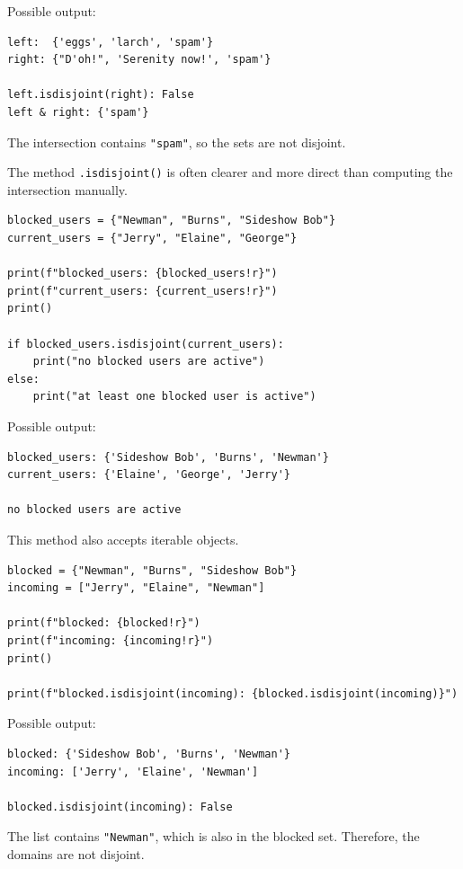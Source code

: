 Possible output:

\begin{verbatim}
left:  {'eggs', 'larch', 'spam'}
right: {"D'oh!", 'Serenity now!', 'spam'}

left.isdisjoint(right): False
left & right: {'spam'}
\end{verbatim}

The intersection contains \texttt{"spam"}, so the sets are not disjoint.

The method \texttt{.isdisjoint()} is often clearer and more direct than computing the intersection manually.

\begin{verbatim}
blocked_users = {"Newman", "Burns", "Sideshow Bob"}
current_users = {"Jerry", "Elaine", "George"}

print(f"blocked_users: {blocked_users!r}")
print(f"current_users: {current_users!r}")
print()

if blocked_users.isdisjoint(current_users):
    print("no blocked users are active")
else:
    print("at least one blocked user is active")
\end{verbatim}

Possible output:

\begin{verbatim}
blocked_users: {'Sideshow Bob', 'Burns', 'Newman'}
current_users: {'Elaine', 'George', 'Jerry'}

no blocked users are active
\end{verbatim}

This method also accepts iterable objects.

\begin{verbatim}
blocked = {"Newman", "Burns", "Sideshow Bob"}
incoming = ["Jerry", "Elaine", "Newman"]

print(f"blocked: {blocked!r}")
print(f"incoming: {incoming!r}")
print()

print(f"blocked.isdisjoint(incoming): {blocked.isdisjoint(incoming)}")
\end{verbatim}

Possible output:

\begin{verbatim}
blocked: {'Sideshow Bob', 'Burns', 'Newman'}
incoming: ['Jerry', 'Elaine', 'Newman']

blocked.isdisjoint(incoming): False
\end{verbatim}

The list contains \texttt{"Newman"}, which is also in the blocked set. Therefore, the domains are not disjoint.

